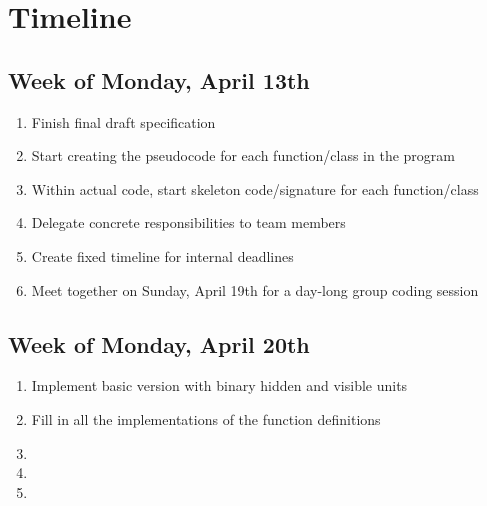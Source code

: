\documentclass[12pt]{article}
\begin{document}
\section{Timeline}
\subsection{Week of Monday, April 13th}
\begin{enumerate}
  \item Finish final draft specification
  \item Start creating the pseudocode for each function/class in the program
  \item Within actual code, start skeleton code/signature for each function/class
  \item Delegate concrete responsibilities to team members
  \item Create fixed timeline for internal deadlines
  \item Meet together on Sunday, April 19th for a day-long group coding session
\end{enumerate}

\subsection{Week of Monday, April 20th}
\begin{enumerate}
  \item Implement basic version with binary hidden and visible units
  \item Fill in all the implementations of the function definitions
  \item 
  \item 
  \item 
\end{enumerate}
\end{document}
